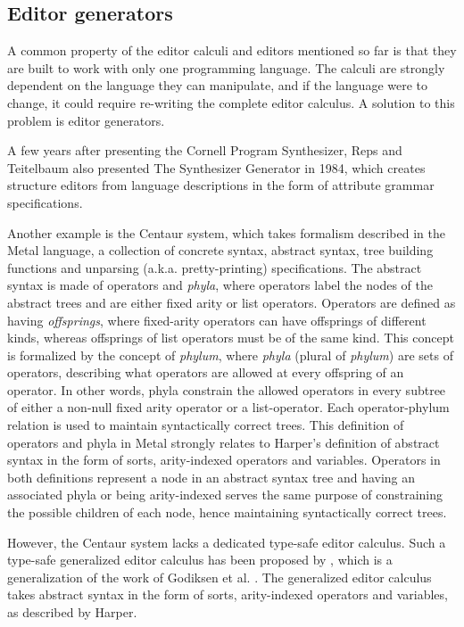 \subsection{Editor generators}
A common property of the editor calculi and editors mentioned so far is that they are built to work with only one programming language. The calculi are strongly dependent on the language they can manipulate, and if the language were to change, it could require re-writing the complete editor calculus. A solution to this problem is editor generators.

A few years after presenting the Cornell Program Synthesizer, Reps and Teitelbaum also presented The Synthesizer Generator\cite{timtom84} in 1984, which creates structure editors from language descriptions in the form of attribute grammar specifications.

Another example is the Centaur system\cite{centaur}, which takes formalism described in the Metal language\cite{metal}, a collection of concrete syntax, abstract syntax, tree building functions and unparsing (a.k.a. pretty-printing) specifications. The abstract syntax is made of operators and \textit{phyla}, where operators label the nodes of the abstract trees and are either fixed arity or list operators. Operators are defined as having \textit{offsprings}, where fixed-arity operators can have offsprings of different kinds, whereas offsprings of list operators must be of the same kind. This concept is formalized by the concept of \textit{phylum}, where \textit{phyla} (plural of \textit{phylum}) are sets of operators, describing what operators are allowed at every offspring of an operator. In other words, phyla constrain the allowed operators in every subtree of either a non-null fixed arity operator or a list-operator. Each operator-phylum relation is used to maintain syntactically correct trees.
This definition of operators and phyla in Metal strongly relates to Harper's definition of abstract syntax\cite{harper} in the form of sorts, arity-indexed operators and variables. Operators in both definitions represent a node in an abstract syntax tree and having an associated phyla or being arity-indexed serves the same purpose of constraining the possible children of each node, hence maintaining syntactically correct trees.

However, the Centaur system\cite{centaur} lacks a dedicated type-safe editor calculus. Such a type-safe generalized editor calculus has been proposed by \cite{aalborg}, which is a generalization of the work of Godiksen et al. \cite{godiksen}. The generalized editor calculus takes abstract syntax in the form of sorts, arity-indexed operators and variables, as described by Harper\cite{harper}.

